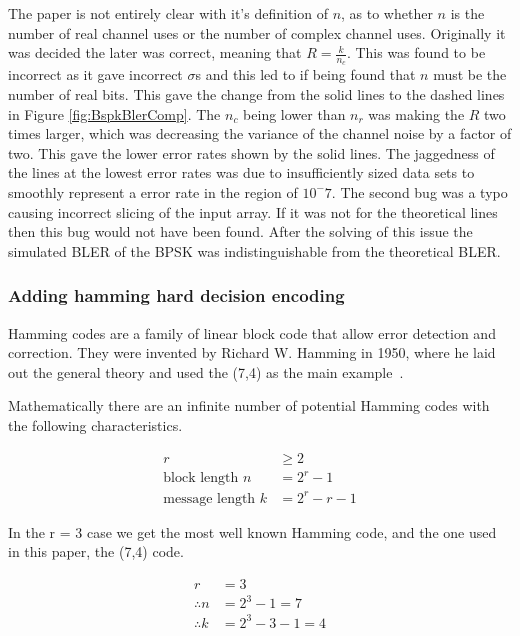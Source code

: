 \documentclass[12pt,onecolumn,letterpaper]{article}
\begin{document}
The paper is not entirely clear with it's definition of $n$, as to whether $n$ is the number of real channel uses or the number of complex channel uses. Originally it was decided the later was correct, meaning that $R = \frac{k}{n_c}$. This was found to be incorrect as it gave incorrect $\sigma$s and this led to if being found that $n$ must be the number of real bits. This gave the change from the solid lines to the dashed lines in Figure \ref{fig:BspkBlerComp}. The $n_c$ being lower than $n_r$ was making the $R$ two times larger, which was decreasing the variance of the channel noise by a factor of two. This gave the lower error rates shown by the solid lines. The jaggedness of the lines at the lowest error rates was due to insufficiently sized data sets to smoothly represent a error rate in the region of $10^-7$. The second bug was a typo causing incorrect slicing of the input array. If it was not for the theoretical lines then this bug would not have been found. After the solving of this issue the simulated BLER of the BPSK was indistinguishable from the theoretical BLER.

\subsubsection{Adding hamming hard decision encoding}

Hamming codes are a family of linear block code that allow error detection and correction. They were invented by Richard W. Hamming in 1950, where he laid out the general theory and used the (7,4) as the main example~\cite{HammingOriginalPaper}.

Mathematically there are an infinite number of potential Hamming codes with the following characteristics.

\begin{align}
   r &\geq 2 \\
   \mbox{block length } n &= 2^r - 1 \\
   \mbox{message length } k &= 2^r -r -1
   \label{eq:GeneralHamming}
\end{align}

In the r = 3 case we get the most well known Hamming code, and the one used in this paper, the (7,4) code.

\begin{align}
   r &= 3 \\
   \therefore n &= 2^3 - 1 = 7 \\
   \therefore k &= 2^3 -3 -1 = 4
   \label{eq:Hamming74Characteristics}
\end{align}
\end{document}
